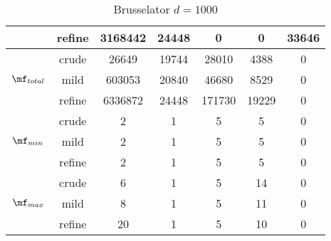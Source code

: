 \begin{table}[htb]
\begin{tabular}{ |c|c|c|c|c|c|c| }
  & refine & 3168442 & 24448 & 0 & 0 & 33646 \\
\hline
  & crude & 26649 & 19744 & 28010 & 4388 & 0 \\
 $\mf_{total}$  & mild & 603053 & 20840 & 46680 & 8529 & 0 \\
  & refine & 6336872 & 24448 & 171730 & 19229 & 0 \\
\hline
  & crude & 2 & 1 & 5 & 5 & 0 \\
 $\mf_{min}$  & mild & 2 & 1 & 5 & 5 & 0 \\
  & refine & 2 & 1 & 5 & 5 & 0 \\
\hline
  & crude & 6 & 1 & 5 & 14 & 0 \\
 $\mf_{max}$  & mild & 8 & 1 & 5 & 11 & 0 \\
  & refine & 20 & 1 & 5 & 10 & 0 \\
\hline
\end{tabular}
\caption{ Brusselator $ d=1000$ }
\end{table}
